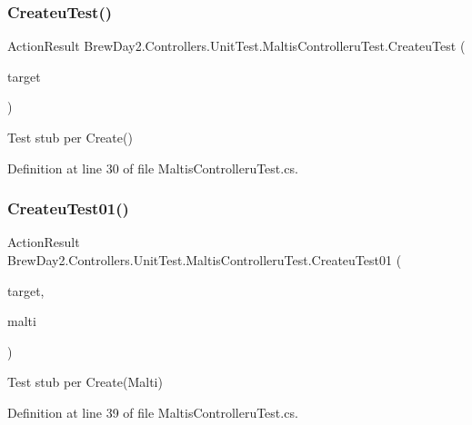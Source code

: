 \subsubsection{\texorpdfstring{Createu\+Test()}{CreateuTest()}}
{\footnotesize\ttfamily Action\+Result Brew\+Day2.\+Controllers.\+Unit\+Test.\+Maltis\+Controlleru\+Test.\+Createu\+Test (\begin{DoxyParamCaption}\item[{\mbox{[}\+Pex\+Assume\+Under\+Test\mbox{]} \mbox{\hyperlink{class_brew_day2_1_1_controllers_1_1_maltis_controller}{Maltis\+Controller}}}]{target }\end{DoxyParamCaption})}



Test stub per Create()



Definition at line 30 of file Maltis\+Controlleru\+Test.\+cs.

\mbox{\label{class_brew_day2_1_1_controllers_1_1_unit_test_1_1_maltis_controlleru_test_a229ca42a99c42c426cfd3e201e561356}} 
\subsubsection{\texorpdfstring{Createu\+Test01()}{CreateuTest01()}}
{\footnotesize\ttfamily Action\+Result Brew\+Day2.\+Controllers.\+Unit\+Test.\+Maltis\+Controlleru\+Test.\+Createu\+Test01 (\begin{DoxyParamCaption}\item[{\mbox{[}\+Pex\+Assume\+Under\+Test\mbox{]} \mbox{\hyperlink{class_brew_day2_1_1_controllers_1_1_maltis_controller}{Maltis\+Controller}}}]{target,  }\item[{\mbox{\hyperlink{class_brew_day2_1_1_models_1_1_malti}{Malti}}}]{malti }\end{DoxyParamCaption})}



Test stub per Create(\+Malti)



Definition at line 39 of file Maltis\+Controlleru\+Test.\+cs.

